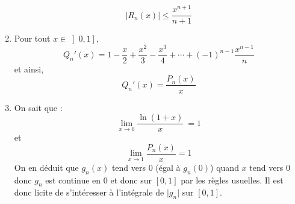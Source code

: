 \documentclass[a4paper,11pt]{report}
\begin{document}
\begin{enumerate}
$$ \boxed{\left\vert R_{n}\left(  x\right)  \right\vert \leq
\dfrac{x^{n+1}}{n+1}}$$

\item Pour tout $x\in\left]  0,1\right]$,
$$ Q_{n}'\left(  x\right)  =1-\dfrac{x}{2}+\dfrac{x^{2}}{3}-\dfrac{x^{3}}{4}+\cdots+\left(  -1\right)^{n-1}\dfrac{x^{n-1}}{n}$$
et ainsi,
$$ \boxed{Q_{n}'\left(  x\right)=\dfrac{P_{n}\left(  x\right)  }{x}}$$


\item On sait que :
$$ \lim_{x \rightarrow 0} \dfrac{\ln\left(  1+x\right)  }{x}\ =1$$
et 
$$ \lim_{x \rightarrow 1} \dfrac{P_{n}\left(  x\right)  }{x}=1$$
On en déduit que $g_{n}\left(  x\right)$ tend vers $0$ (égal à $g_n(0)$) quand $x$ tend vers $0$ donc $g_n$ est continue en $0$ et donc sur $[0,1]$ par les règles usuelles. Il est donc licite de s'intéresser à l'intégrale de $\vert g_n\vert$ sur $[0,1]$.

\medskip


\end{enumerate}
\end{document}
